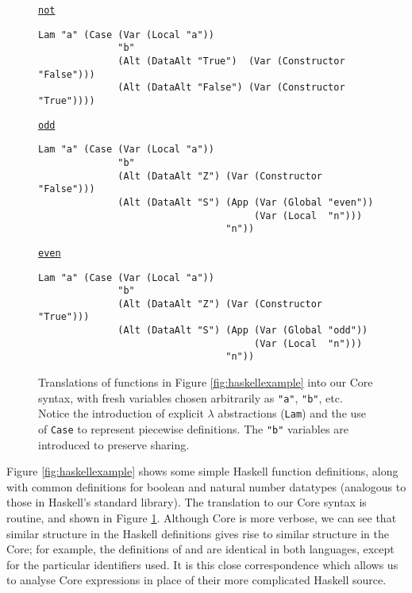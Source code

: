 \begin{figure}
  \begin{small}
    \underline{\texttt{not}}
    \begin{verbatim}
Lam "a" (Case (Var (Local "a"))
              "b"
              (Alt (DataAlt "True")  (Var (Constructor "False")))
              (Alt (DataAlt "False") (Var (Constructor "True"))))
    \end{verbatim}

    \underline{\texttt{odd}}
    \begin{verbatim}
Lam "a" (Case (Var (Local "a"))
              "b"
              (Alt (DataAlt "Z") (Var (Constructor "False")))
              (Alt (DataAlt "S") (App (Var (Global "even"))
                                      (Var (Local  "n")))
                                 "n"))
    \end{verbatim}

    \underline{\texttt{even}}
    \begin{verbatim}
Lam "a" (Case (Var (Local "a"))
              "b"
              (Alt (DataAlt "Z") (Var (Constructor "True")))
              (Alt (DataAlt "S") (App (Var (Global "odd"))
                                      (Var (Local  "n")))
                                 "n"))
    \end{verbatim}
  \end{small}
  \caption{Translations of functions in Figure \ref{fig:haskellexample} into our Core syntax, with fresh variables chosen arbitrarily as \texttt{"a"}, \texttt{"b"}, etc. Notice the introduction of explicit $\lambda$ abstractions (\texttt{Lam}) and the use of \texttt{Case} to represent piecewise definitions. The \texttt{"b"} variables are introduced to preserve sharing.}
  \label{fig:coreexample}
\end{figure}

Figure \ref{fig:haskellexample} shows some simple Haskell function definitions, along with common definitions for boolean and natural number datatypes (analogous to those in Haskell's standard library). The translation to our Core syntax is routine, and shown in Figure \ref{fig:coreexample}. Although Core is more verbose, we can see that similar structure in the Haskell definitions gives rise to similar structure in the Core; for example, the definitions of  and  are identical in both languages, except for the particular identifiers used. It is this close correspondence which allows us to analyse Core expressions in place of their more complicated Haskell source.

